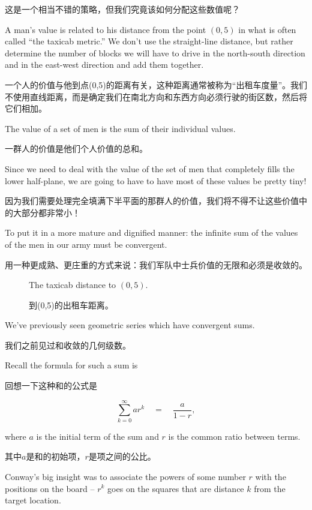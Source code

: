 这是一个相当不错的策略，但我们究竟该如何分配这些数值呢？

A man's value is related to his distance from the point $(0,5)$ in what
is often called ``the taxicab metric.''   We don't use the straight-line
distance, but rather determine the number of blocks we will have to drive
in the north-south direction and in the east-west direction and add them 
together.

一个人的价值与他到点(0,5)的距离有关，这种距离通常被称为“出租车度量”。我们不使用直线距离，而是确定我们在南北方向和东西方向必须行驶的街区数，然后将它们相加。

The value of a set of men is the sum of their individual values.

一群人的价值是他们个人价值的总和。

Since we need to deal with the value of the set of men that completely fills
the lower half-plane, we are going to have to have most of these values be
pretty tiny!

因为我们需要处理完全填满下半平面的那群人的价值，我们将不得不让这些价值中的大部分都非常小！

To put it in a more mature and dignified manner: the infinite
sum of the values of the men in our army must be convergent.

用一种更成熟、更庄重的方式来说：我们军队中士兵价值的无限和必须是收敛的。

\begin{figure}[!hbtp] 
\begin{center}

\end{center}
\caption[The taxicab distance to $(0,5)$.]{The taxicab distance to $(0,5)$.}
\caption[到(0,5)的出租车距离。]{到(0,5)的出租车距离。}
\label{fig:taxicab_distance}
\end{figure}

We've previously seen geometric series which have convergent sums.

我们之前见过和收敛的几何级数。

Recall 
the formula for such a sum is

回想一下这种和的公式是

\[ \sum_{k=0}^{\infty} ar^k  \quad = \quad \frac{a}{1-r}, \]

\noindent where $a$ is the initial term of the sum and $r$ is the common
ratio between terms.

\noindent 其中$a$是和的初始项，$r$是项之间的公比。

Conway's big insight was to associate the powers of some number $r$ with
the positions on the board -- $r^k$ goes on the squares that are distance
$k$ from the target location.

